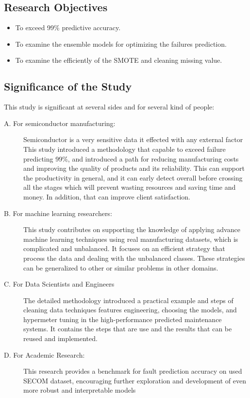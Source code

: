 \documentclass[12pt,oneside]{article}
\begin{document}
\subsection{Research Objectives}
\begin{itemize}[label=\textcolor{DeepMaroon}{\textbullet}]
    \item To exceed 99\% predictive accuracy.
    \item To examine the ensemble models for optimizing the failures prediction.
    \item To examine the efficiently of the SMOTE and cleaning missing value.
\end{itemize}

\subsection{Significance of the Study}
This study is significant at several sides and for several kind of people:
\begin{description}
    \item[\textcolor{DeepMaroon}{A. For semiconductor manufacturing:}]  Semiconductor is a very sensitive data it effected with any external factor This study introduced a methodology that capable to exceed failure predicting 99\%, and introduced a path for reducing manufacturing costs and improving the quality of products and its reliability. This can support the productivity in general, and it can early detect overall before crossing all the stages which will prevent wasting resources and saving time and money. In addition, that can improve client satisfaction.
    \item[\textcolor{DeepMaroon}{B. For machine learning researchers:}] This study contributes on supporting the knowledge of applying advance machine learning techniques using real manufacturing datasets, which is complicated and unbalanced. It focuses on an efficient strategy that process the data and dealing with the unbalanced classes. These strategies can be generalized to other or similar problems in other domains.
    \item[\textcolor{DeepMaroon}{C. For Data Scientists and Engineers}]The detailed methodology introduced a practical example and steps of cleaning data techniques features engineering, choosing the models, and hypermeter tuning in the high-performance predicted maintenance systems. It contains the steps that are use and the results that can be reused and implemented.
    \item[\textcolor{DeepMaroon}{D. For Academic Research:}]This research provides a benchmark for fault prediction accuracy on used SECOM dataset, encouraging further exploration and development of even more robust and interpretable models
\end{description}
\end{document}
